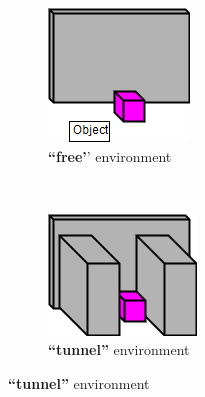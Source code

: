 \documentclass[journal]{IEEEtran}
\begin{document}
%
\begin{figure}[t]
    \centering
    \begin{subfigure}[t]{0.15\textwidth}
        \includegraphics[width=\textwidth]{images/FreeEnvironment.png}
        \caption{\textbf{``free'}' environment}
    \end{subfigure} \ \ \ \ \ \
    \begin{subfigure}[t]{0.15\textwidth}
        \includegraphics[width=\textwidth]{images/TunnelEnvironment.png}
        \caption{\textbf{``tunnel''} environment}
    \end{subfigure}
    

\end{figure}
\end{document}
